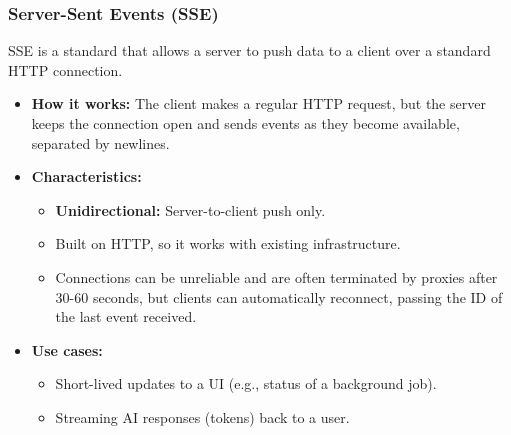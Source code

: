 \documentclass{article}
\begin{document}
\subsubsection{Server-Sent Events (SSE)}
SSE is a standard that allows a server to push data to a client over a standard HTTP connection.
\begin{itemize}
    \item \textbf{How it works:} The client makes a regular HTTP request, but the server keeps the connection open and sends events as they become available, separated by newlines.
    \item \textbf{Characteristics:}
    \begin{itemize}
        \item \textbf{Unidirectional:} Server-to-client push only.
        \item Built on HTTP, so it works with existing infrastructure.
        \item Connections can be unreliable and are often terminated by proxies after 30-60 seconds, but clients can automatically reconnect, passing the ID of the last event received.
    \end{itemize}
    \item \textbf{Use cases:}
    \begin{itemize}
        \item Short-lived updates to a UI (e.g., status of a background job).
        \item Streaming AI responses (tokens) back to a user.
    \end{itemize}
\end{itemize}
\end{document}
